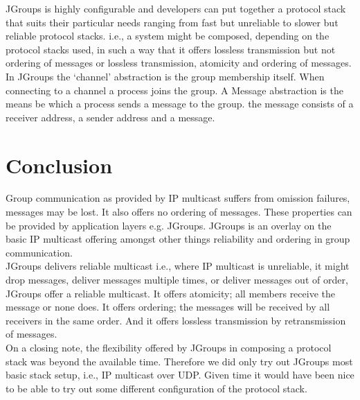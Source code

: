 JGroups is highly configurable and developers can put together a protocol stack that suits their particular needs ranging from fast but unreliable to slower but reliable protocol stacks. i.e., a system might be composed, depending on the protocol stacks used, in such a way that it offers lossless transmission but not ordering of messages or lossless transmission, atomicity and ordering of messages.\\

In JGroups the ‘channel’ abstraction is the group membership itself. When connecting to a channel a process joins the group. A Message abstraction is the means be which a process sends a message to the group. the message consists of a receiver address, a sender address and a message. 


\section{Conclusion}
\label{jgroup_conclusion}
Group communication as provided by IP multicast suffers from omission failures, messages may be lost. It also offers no ordering of messages. These properties can be provided by application layers e.g. JGroups. JGroups is an overlay on the basic IP multicast offering amongst other things reliability and ordering in group communication. \\

JGroups delivers reliable multicast i.e., where IP multicast is unreliable, it might drop messages, deliver messages multiple times, or deliver messages out of order, JGroups offer a reliable multicast. It offers atomicity; all members receive the message or none does. It offers ordering; the messages will be received by all receivers in the same order. And it offers lossless transmission by retransmission of messages.\\

On a closing note, the flexibility offered by JGroups in composing a protocol stack was beyond the available time. Therefore we did only try out JGroups most basic stack setup, i.e., IP multicast over UDP. Given time it would have been nice to be able to try out some different configuration of the protocol stack.  

